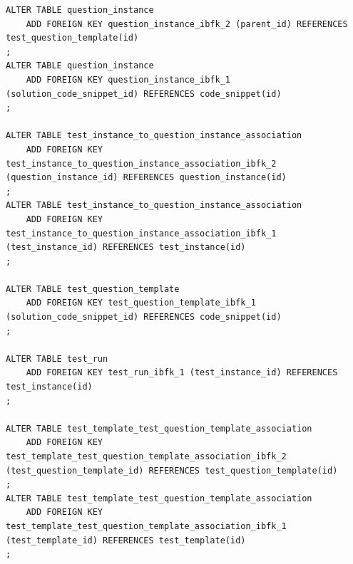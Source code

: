 \documentclass{article}
\begin{document}
\begin{lstlisting}
ALTER TABLE question_instance
	ADD FOREIGN KEY question_instance_ibfk_2 (parent_id) REFERENCES test_question_template(id)
;
ALTER TABLE question_instance
	ADD FOREIGN KEY question_instance_ibfk_1 (solution_code_snippet_id) REFERENCES code_snippet(id)
;

ALTER TABLE test_instance_to_question_instance_association
	ADD FOREIGN KEY test_instance_to_question_instance_association_ibfk_2 (question_instance_id) REFERENCES question_instance(id)
;
ALTER TABLE test_instance_to_question_instance_association
	ADD FOREIGN KEY test_instance_to_question_instance_association_ibfk_1 (test_instance_id) REFERENCES test_instance(id)
;

ALTER TABLE test_question_template
	ADD FOREIGN KEY test_question_template_ibfk_1 (solution_code_snippet_id) REFERENCES code_snippet(id)
;

ALTER TABLE test_run
	ADD FOREIGN KEY test_run_ibfk_1 (test_instance_id) REFERENCES test_instance(id)
;

ALTER TABLE test_template_test_question_template_association
	ADD FOREIGN KEY test_template_test_question_template_association_ibfk_2 (test_question_template_id) REFERENCES test_question_template(id)
;
ALTER TABLE test_template_test_question_template_association
	ADD FOREIGN KEY test_template_test_question_template_association_ibfk_1 (test_template_id) REFERENCES test_template(id)
;
\end{lstlisting}
\end{document}
